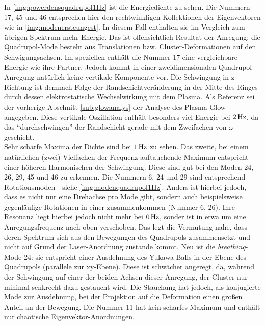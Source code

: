 \documentclass[numbers=noenddot,a4paper,notitlepage,twoside,BCOR15mm]{scrbook}
\newcommand{\tilt}[1]{\textit{#1}}
\begin{document}
						In \ref{img:powerdensquadrupol1Hz} ist die Energiedichte zu sehen. Die Nummern 17, 45 und 46 entsprechen hier den rechtwinkligen Kollektionen der Eigenvektoren wie in \ref{img:modenersteungest}. In diesem Fall enthalten sie im Vergleich zum übrigen Spektrum mehr Energie. Das ist offensichtlich Resultat der Anregung: die Quadrupol-Mode besteht aus Translationen bzw. Cluster-Deformationen auf den Schwigungsachsen. Im speziellen enthält die Nummer 17 eine vergleichbare Energie wie ihre Partner. Jedoch kommt in einer zweidimensionalen Quadrupol-Anregung natürlich keine vertikale Komponente vor. Die Schwingung in z-Richtung ist demnach Folge der Randschichtveränderung in der Mitte des Ringes durch dessen elektrostatische Wechselwirkung mit dem Plasma. Als Referenz sei der vorherige Abschnitt \ref{sub:glowanalys} der Analyse des Plasma-Glow angegeben. Diese vertikale Oszillation enthält besonders viel Energie bei $\unit[2]{Hz}$, da das "`durchschwingen"' der Randschicht gerade mit dem Zweifachen von $\omega$ geschieht.\\
						Sehr scharfe Maxima der Dichte sind bei $\unit[1]{Hz}$ zu sehen. Das zweite, bei einem natürlichen (zwei) Vielfachen der Frequenz auftauchende Maximum entspricht einer höheren Harmonischen der Schwingung. Diese sind gut bei den Moden 24, 26, 29, 45 und 46 zu erkennen. Die Nummern 6, 24 und 29 sind entsprechend Rotationsmoden - siehe \ref{img:modenquadrupol1Hz}. Anders ist hierbei jedoch, dass es nicht nur eine Drehachse pro Mode gibt, sondern auch beispielsweise gegenläufige Rotationen in einer zusammenkommen (Nummer 6, 26). Ihre Resonanz liegt hierbei jedoch nicht mehr bei $\unit[0]{Hz}$, sonder ist in etwa um eine Anregungsfrequenz nach oben verschoben. Das legt die Vermutung nahe, dass deren Spektrum sich aus den Bewegungen des Quadrupols zusammensetzt und nicht auf Grund der Laser-Anordnung zustande kommt. Neu ist die \tilt{breathing}-Mode 24: sie entspricht einer Ausdehnung des Yukawa-Balls in der Ebene des Quadrupols (parallele zur xy-Ebene). Diese ist schwächer angeregt, da, während der Schwingung auf einer der beiden Achsen dieser Anregung, der Cluster nur minimal senkrecht dazu gestaucht wird. Die Stauchung hat jedoch, als konjugierte Mode zur Ausdehnung, bei der Projektion auf die Deformation einen großen Anteil an der Bewegung. Die Nummer 11 hat kein scharfes Maximum und enthält nur chaotische Eigenvektor-Anordnungen.
\end{document}
